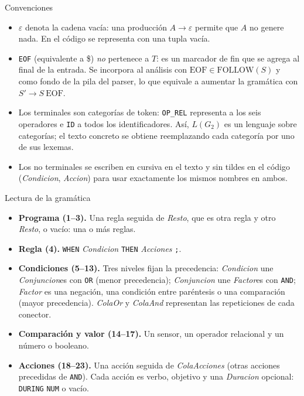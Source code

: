 \documentclass[11pt,letterpaper]{article}
\makeatletter
\renewcommand\subsection{\@startsection{subsection}{2}{\z@}{-2.6ex\@plus -1ex \@minus -.2ex}{1.0ex \@plus .2ex}%
  {\normalfont\large\bfseries}}
\newcommand{\T}[1]{\texttt{#1}}
\newcommand{\NT}[1]{\textit{#1}}
\makeatother
\begin{document}
\subsection{Convenciones}
\begin{itemize}
\item $\varepsilon$ denota la cadena vacía: una producción $A \to \varepsilon$ permite que $A$ no genere nada.
En el código se representa con una tupla vacía.
\item \T{EOF} (equivalente a \$) \emph{no} pertenece a $T$: es un marcador de fin que se agrega al final de la
entrada. Se incorpora al análisis con $\mathrm{EOF} \in \mathrm{FOLLOW}(S)$ y como fondo de la pila del parser,
lo que equivale a aumentar la gramática con $S' \to S\ \mathrm{EOF}$.
\item Los terminales son categorías de token: \T{OP\_REL} representa a los seis operadores e \T{ID} a todos
los identificadores. Así, $L(G_2)$ es un lenguaje sobre categorías; el texto concreto se obtiene
reemplazando cada categoría por uno de sus lexemas.
\item Los no terminales se escriben en cursiva en el texto y sin tildes en el código (\NT{Condicion},
\NT{Accion}) para usar exactamente los mismos nombres en ambos.
\end{itemize}

\subsection{Lectura de la gramática}
\begin{itemize}
\item \textbf{Programa (1--3).} Una regla seguida de \NT{Resto}, que es otra regla y otro \NT{Resto}, o vacío: una
o más reglas.
\item \textbf{Regla (4).} \T{WHEN} \NT{Condicion} \T{THEN} \NT{Acciones} \T{;}.
\item \textbf{Condiciones (5--13).} Tres niveles fijan la precedencia: \NT{Condicion} une \NT{Conjuncion}es con
\T{OR} (menor precedencia); \NT{Conjuncion} une \NT{Factor}es con \T{AND}; \NT{Factor} es una negación, una
condición entre paréntesis o una comparación (mayor precedencia). \NT{ColaOr} y \NT{ColaAnd} representan
las repeticiones de cada conector.
\item \textbf{Comparación y valor (14--17).} Un sensor, un operador relacional y un número o booleano.
\item \textbf{Acciones (18--23).} Una acción seguida de \NT{ColaAcciones} (otras acciones precedidas de \T{AND}).
Cada acción es verbo, objetivo y una \NT{Duracion} opcional: \T{DURING} \T{NUM} o vacío.
\end{itemize}
\end{document}
